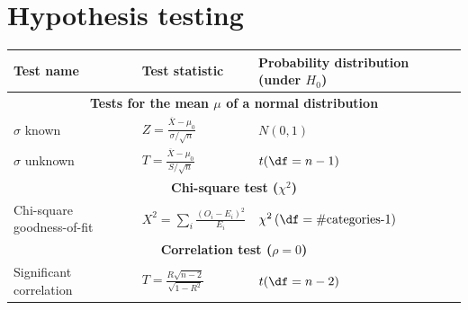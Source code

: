 \documentclass[11pt,a4paper,english]{article} %
\begin{document}
\section*{Hypothesis testing}
\begin{center}
    \renewcommand{\arraystretch}{1.5}
    \begin{tabular}{m{}m{}m{}}
        \toprule
            \textbf{Test name} & \textbf{Test statistic} & \textbf{Probability distribution (under $H_0$)} \\
        \midrule
            \multicolumn{3}{c}{\textbf{Tests for the mean $\mu$ of a normal distribution}} \\ 
        \midrule
            $\sigma$ known    & $Z = \frac{\overline{X} - \mu_0}{\sigma / \sqrt{n}}$ & $N(0, 1)$ \\
            $\sigma$ unknown  & $T = \frac{\overline{X} - \mu_0}{S / \sqrt{n}}$ & $t(\df=n-1)$ \\
        \midrule
            \multicolumn{3}{c}{\textbf{Chi-square test ($\chi^2$)}} \\
        \midrule
            Chi-square \newline goodness-of-fit & $X^2 = \sum_{i} \frac{(O_{i} - E_{i})^2}{E_{i}}$ & $\chi^2\left(\df=\text{\#categories-1}\right)$ \\
        \midrule
            \multicolumn{3}{c}{\textbf{Correlation test ($\rho = 0$)}} \\ 
        \midrule
            Significant \newline correlation & $T = \frac{R \sqrt{n-2}}{\sqrt{1-R^2}}$ & $t(\df=n-2)$ \\
        \bottomrule
    \end{tabular}
\end{center}
\end{document}
